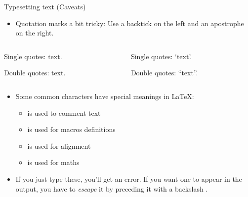 \documentclass[,aspectratio=43]{beamer}
\newenvironment{Shaded}{\begin{snugshade}}{\end{snugshade}}
\newcommand{\NormalTok}[1]{#1}
\providecommand{\tightlist}{%
  \setlength{\itemsep}{0pt}\setlength{\parskip}{0pt}}
\begin{document}
\begin{frame}[fragile]{Typesetting text (Caveats)}
\protect\hypertarget{typesetting-text-caveats}{}
\begin{itemize}
\tightlist
\item
  Quotation marks a bit tricky: Use a backtick  on
  the left and an apostrophe  on the right.
\end{itemize}

\begin{columns}[T]
\begin{column}{0.48\textwidth}
\vspace{-1em}

\begin{Shaded}
\begin{Highlighting}[]
\NormalTok{Single quotes: \textasciigrave{}text\textquotesingle{}.}

\NormalTok{Double quotes: \textasciigrave{}\textasciigrave{}text\textquotesingle{}\textquotesingle{}.}
\end{Highlighting}
\end{Shaded}
\end{column}

\begin{column}{0.48\textwidth}
Single quotes: `text'.

\hfill\break

Double quotes: ``text''.
\end{column}
\end{columns}

\vspace{0.5em}

\begin{itemize}
\item
  Some common characters have special meanings in \LaTeX :

  \begin{itemize}
  \tightlist
  \item
    \framebox{\texttt{\%}} is used to comment text
  \item
    \framebox{\texttt{\#}} is used for macros definitions
  \item
    \framebox{\texttt{\&}} is used for alignment
  \item
    \framebox{\texttt{\$}} is used for maths
  \end{itemize}
\item
  If you just type these, you'll get an error. If you want one to appear
  in the output, you have to \emph{escape} it by preceding it with a
  backslash \framebox{\texttt{\textbackslash}}.
\end{itemize}


\end{frame}
\end{document}
